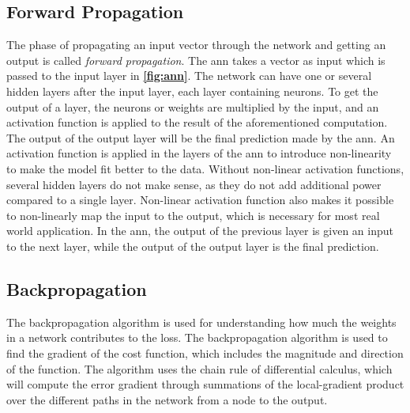 \subsection{Forward Propagation}
The phase of propagating an input vector through the network and getting an output is called \textit{forward propagation}. The \gls{ann} takes a vector as input which is passed to the input layer in \textbf{\autoref{fig:ann}}. The network can have one or several hidden layers after the input layer, each layer containing neurons. To get the output of a layer, the neurons or weights are multiplied by the input, and an activation function is applied to the result of the aforementioned computation.
The output of the output layer will be the final prediction made by the \gls{ann}.\cite{ann} An activation function is applied in the layers of the \gls{ann} to introduce non-linearity to make the model fit better to the data. Without non-linear activation functions, several hidden layers do not make sense, as they do not add additional power compared to a single layer. Non-linear activation function also makes it possible to non-linearly map the input to the output, which is necessary for most real world application.%
In the \gls{ann}, the output of the previous layer is given an input to the next layer, while the output of the output layer is the final prediction.\cite{ann}%

\subsection{Backpropagation}
The backpropagation algorithm is used for understanding how much the weights in a network contributes to the loss. The backpropagation algorithm is used to find the gradient of the cost function, which includes the magnitude and direction of the function. The algorithm uses the chain rule of differential calculus, which will compute the error gradient through summations of the local-gradient product over the different paths in the network from a node to the output. %

